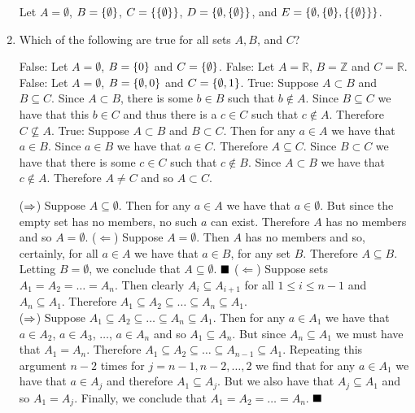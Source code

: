 \documentclass[12pt]{book}
\begin{document}
\begin{enumerate}
{Let $A = \emptyset$, $B = \set{\emptyset}$, $C = \set{\set{\emptyset}}$, $D = \set{\emptyset, \set{\emptyset}}$, and $E = \set{\emptyset, \set{\emptyset}, \set{\set{\emptyset}}}$.}
\item Which of the following are true for all sets $A, B$, and $C$?
	\begin{enumerate}
	{False: Let $A = \emptyset$, $B = \set{0}$ and $C = \set{\emptyset}$.}
	{False: Let $A = \mathbb{R}$, $B = \mathbb{Z}$ and $C = \mathbb{R}$.}
	{False: Let $A = \emptyset$, $B = \set{\emptyset, 0}$ and $C = \set{\emptyset, 1}$.}
	{True: Suppose $A \subset B$ and $B \subseteq C$. Since $A \subset B$, there is some $b \in B$ such that $b \notin A$. Since $B \subseteq C$ we have that this $b \in C$ and thus there is a $c \in C$ such that $c \notin A$. Therefore $C \not\subseteq A$.}
	{True: Suppose $A \subset B$ and $B \subset C$. Then for any $a \in A$ we have that $a \in B$. Since $a \in B$ we have that $a \in C$. Therefore $A \subseteq C$. Since $B \subset C$ we have that there is some $c \in C$ such that $c \notin B$. Since $A \subset B$ we have that $c \notin A$. Therefore $A \neq C$ and so $A \subset C$.}
	\end{enumerate}
{($\then$) Suppose $A \subseteq \emptyset$. Then for any $a \in A$ we have that $a \in \emptyset$. But since the empty set has no members, no such $a$ can exist. Therefore $A$ has no members and so $A = \emptyset$. ($\Leftarrow$) Suppose $A = \emptyset$. Then $A$ has no members and so, certainly, for all $a \in A$ we have that $a \in B$, for any set $B$. Therefore $A \subseteq B$. Letting $B = \emptyset$, we conclude that $A \subseteq \emptyset$. $\qed$}
{($\Leftarrow$) Suppose sets $A_1 = A_2 = \dots = A_n$. Then clearly $A_i \subseteq A_{i+1}$ for all $1 \leq i \leq n - 1$ and $A_n \subseteq A_1$. Therefore $A_1 \subseteq A_2 \subseteq \dots \subseteq A_n \subseteq A_1$.\\ ($\then$) Suppose $A_1 \subseteq A_2 \subseteq \dots \subseteq A_n \subseteq A_1$. Then for any $a \in A_1$ we have that $a \in A_2$, $a \in A_3$, $\dots$, $a \in A_n$ and so $A_1 \subseteq A_n$. But since $A_n \subseteq A_1$ we must have that $A_1 = A_n$. Therefore $A_1 \subseteq A_2 \subseteq \dots \subseteq A_{n-1} \subseteq A_1$. Repeating this argument $n - 2$ times for $j = n - 1, n - 2, \dots, 2$ we find that for any $a \in A_1$ we have that $a \in A_j$ and therefore $A_1 \subseteq A_j$. But we also have that $A_j \subseteq A_1$ and so $A_1 = A_j$. Finally, we conclude that $A_1 = A_2 = \dots = A_n$. $\qed$}

\end{enumerate}
\end{document}
